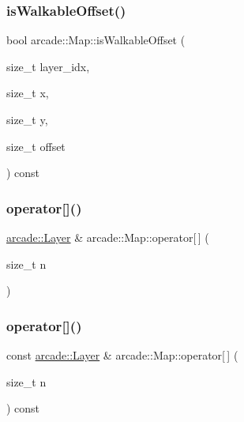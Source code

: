 \mbox{\label{classarcade_1_1_map_a15d5bbda533aab8362cac28a3f675d27}} 
\subsubsection{\texorpdfstring{is\+Walkable\+Offset()}{isWalkableOffset()}}
{\footnotesize\ttfamily bool arcade\+::\+Map\+::is\+Walkable\+Offset (\begin{DoxyParamCaption}\item[{size\+\_\+t}]{layer\+\_\+idx,  }\item[{size\+\_\+t}]{x,  }\item[{size\+\_\+t}]{y,  }\item[{size\+\_\+t}]{offset }\end{DoxyParamCaption}) const}

\mbox{\label{classarcade_1_1_map_afa393c5333d4cd1d24a1e145b4800769}} 
\subsubsection{\texorpdfstring{operator[]()}{operator[]()}\hspace{0.1cm}{\footnotesize\ttfamily [1/2]}}
{\footnotesize\ttfamily \hyperlink{classarcade_1_1_layer}{arcade\+::\+Layer} \& arcade\+::\+Map\+::operator\mbox{[}$\,$\mbox{]} (\begin{DoxyParamCaption}\item[{size\+\_\+t}]{n }\end{DoxyParamCaption})}

\mbox{\label{classarcade_1_1_map_a83e8988805a8d8cd410080d342964c5f}} 
\subsubsection{\texorpdfstring{operator[]()}{operator[]()}\hspace{0.1cm}{\footnotesize\ttfamily [2/2]}}
{\footnotesize\ttfamily const \hyperlink{classarcade_1_1_layer}{arcade\+::\+Layer} \& arcade\+::\+Map\+::operator\mbox{[}$\,$\mbox{]} (\begin{DoxyParamCaption}\item[{size\+\_\+t}]{n }\end{DoxyParamCaption}) const}

